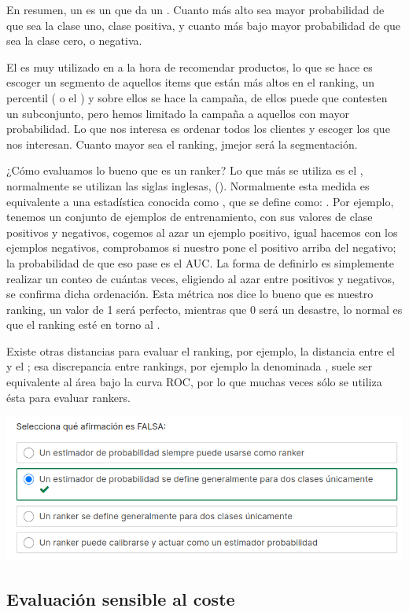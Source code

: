 En resumen, un  es un  que da un . Cuanto más alto sea mayor probabilidad de que sea la clase uno, clase positiva, y cuanto más bajo mayor probabilidad de que sea la clase cero, o negativa.

El  es muy utilizado en  a la hora de recomendar productos, lo que se hace es escoger un segmento de aquellos items que están más altos en el ranking, un percentil ( o el ) y sobre ellos se hace la campaña, de ellos puede que contesten un subconjunto, pero hemos limitado la campaña a aquellos con mayor probabilidad. Lo que nos interesa es ordenar todos los clientes y escoger los que nos interesan. Cuanto mayor sea el ranking, jmejor será la segmentación.

¿Cómo evaluamos lo bueno que es un ranker? Lo que más se utiliza es el , normalmente se utilizan las siglas inglesas, (). Normalmente esta medida es equivalente a una estadística conocida como , que se define como: . Por ejemplo, tenemos un conjunto de ejemplos de entrenamiento, con sus valores de clase positivos y negativos, cogemos al azar un ejemplo positivo, igual hacemos con los ejemplos negativos, comprobamos si nuestro  pone el positivo arriba del negativo; la probabilidad de que eso pase es el AUC. La forma de definirlo es simplemente realizar un conteo de cuántas veces, eligiendo al azar entre positivos y negativos, se confirma dicha ordenación. Esta métrica nos dice lo bueno que es nuestro ranking, un valor de 1 será perfecto, mientras que 0 será un desastre, lo normal es que el ranking esté en torno al .

Existe otras distancias para evaluar el ranking, por ejemplo, la distancia entre el  y el ; esa discrepancia entre rankings, por ejemplo la denominada , suele ser equivalente al área bajo la curva ROC, por lo que muchas veces sólo se utiliza ésta para evaluar rankers.

\begin{center}
    \includegraphics[scale=.55]{images/mod02-19.png}
\end{center}

\subsection{Evaluación sensible al coste}

